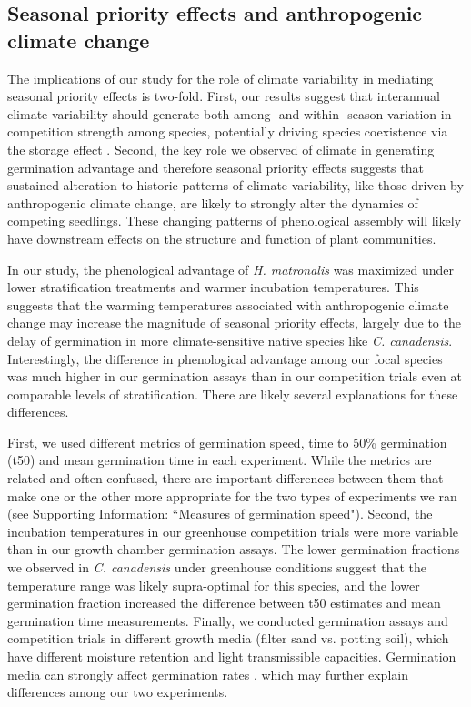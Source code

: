 \documentclass{article}[11pt]
\begin{document}
{\subsection*{Seasonal priority effects and anthropogenic climate change}
The implications of our study for the role of climate variability in mediating seasonal priority effects is two-fold. First, our results suggest that interannual climate variability should generate both among- and within- season variation in competition strength among species, potentially driving species coexistence via the storage effect \citep{Chesson:2003ve}. Second, the key role we observed of climate in generating germination advantage and therefore seasonal priority effects suggests that sustained alteration to historic patterns of climate variability, like those driven by anthropogenic climate change, are likely to strongly alter the dynamics of competing seedlings. These changing patterns of phenological assembly will likely have downstream effects on the structure and function of plant communities.

In our study, the phenological advantage of \textit{H. matronalis} was maximized under lower stratification treatments and warmer incubation temperatures. This suggests that the warming temperatures associated with anthropogenic climate change may increase the magnitude of seasonal priority effects, largely due to the delay of germination in more climate-sensitive native species like \textit{C. canadensis}. Interestingly, the difference in phenological advantage among our focal species was much higher in our germination assays than in our competition trials even at comparable levels of stratification. There are likely several explanations for these differences.

First, we used different metrics of germination speed, time to 50\% germination (t50) and mean germination time in each experiment. While the metrics are related and often confused, there are important differences between them that make one or the other more appropriate for the two types of experiments we ran (see Supporting Information: ``Measures of germination speed"). Second, the incubation temperatures in our greenhouse competition trials were more variable than in our growth chamber germination assays. The lower germination fractions we observed in \textit{C. canadensis} under greenhouse conditions suggest that the temperature range was likely supra-optimal for this species, and the lower germination fraction increased the difference between t50 estimates and mean germination time measurements. Finally, we  conducted germination assays and competition trials in different growth media (filter sand vs. potting soil), which have different moisture retention and light transmissible capacities. Germination media can strongly affect germination rates \citep{Baskin2014}, which may further explain differences among our two experiments.

}
\end{document}

